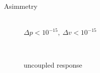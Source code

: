 \documentclass[aspectratio=169,xcolor=dvipsnames]{beamer}
\begin{document}
\begin{frame}{Asimmetry}
\begin{figure}
\begin{minipage}{\linewidth}
\begin{minipage}{0.5\linewidth}
			\begin{minipage}{0.45\linewidth}
				\fontsize{3pt}{4pt}\selectfont{\def\svgwidth{\linewidth}
					}	
			\end{minipage}
			\vspace{0.03\linewidth}
						\\ \tiny{$\Delta p <10^{-15} ,\:\Delta v <10^{-15}$}
		\end{minipage}\hfill
	\end{minipage}
			\vspace{0.02\linewidth}\\
		\begin{minipage}{\linewidth}
				\begin{minipage}[c]{0.3\linewidth}\centering
\scriptsize{uncoupled response}\\\vspace{0.05\linewidth}  \fontsize{3pt}{4pt}\selectfont{\texttt{SMTAddEssentialBoundary[\textcolor{gray}{"p"}, 1 -> \textcolor{myred}{0}]];}}
			\end{minipage}\hfill
	\begin{minipage}[c]{0.3\linewidth}\centering
	\fontsize{3pt}{4pt}\selectfont{\def\svgwidth{\linewidth}
	}	
	\end{minipage}\hfill
	\begin{minipage}[c]{0.32\linewidth}\centering
	\fontsize{3pt}{4pt}\selectfont{\def\svgwidth{\linewidth}
	}	
	\end{minipage}\hfill
\end{minipage}
\end{figure}
\end{frame}
\end{document}
